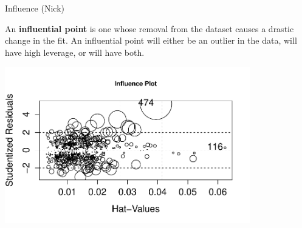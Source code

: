 \documentclass[table]{beamer}\usepackage[]{graphicx}\usepackage[]{color}
\begin{document}
\begin{frame}{Influence (Nick)}  

{\fontsize{0.3cm}{1em}\selectfont
An \textbf{influential point} is one whose removal from the dataset causes a drastic change in the fit.  An influential point will either be an outlier in the data, will have high leverage, or will have both.}




\begin{center}
\includegraphics[width=0.8\textwidth]{influence}
\end{center}

\end{frame}
\end{document}
